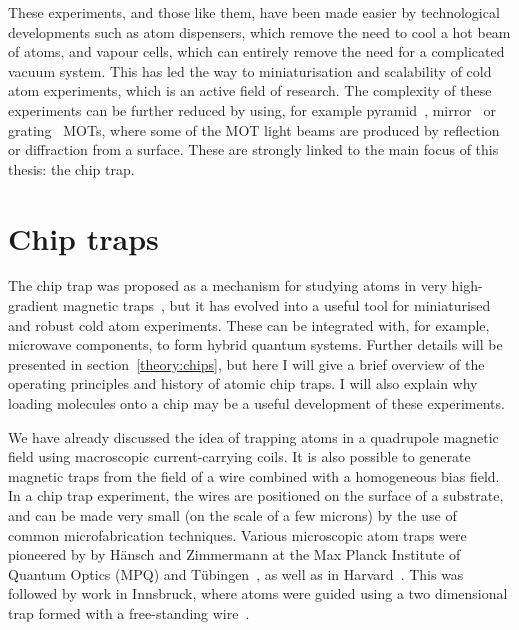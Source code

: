 These experiments, and those like them, have been made easier by technological
developments such as atom dispensers, which remove the need to cool
a hot beam of atoms, and vapour cells, which can entirely remove the
need for a complicated vacuum system. This has led the way to miniaturisation
and scalability of cold atom experiments, which is an active field of research.
The complexity of these experiments can be further reduced by using, for
example pyramid~\cite{Lee:96}, mirror~\cite{Reichel1999, 4797887} or
grating~\cite{Nshii2013} MOTs, where some of the MOT light beams are produced
by reflection or diffraction from a surface. These are strongly linked to the
main focus of this thesis: the chip trap.

\section{Chip traps}

The chip trap was proposed as a mechanism for studying atoms in very
high-gradient magnetic traps~\cite{PhysRevA.52.4004}, but it has evolved into a
useful tool for miniaturised and robust cold atom experiments. These can be
integrated with, for example, microwave components, to form hybrid quantum
systems. Further details will be presented in section~\ref{theory:chips}, but
here I will give a brief overview of the operating principles and history of
atomic chip traps. I will also explain why loading molecules onto a chip may be
a useful development of these experiments.

We have already discussed the idea of trapping atoms in a quadrupole magnetic
field using macroscopic current-carrying coils. It is also possible to generate
magnetic traps from the field of a wire combined with a homogeneous bias field.
In a chip trap experiment, the wires are positioned on the surface of a
substrate, and can be made very small (on the scale of a few microns) by the
use of common microfabrication techniques. Various microscopic atom traps were
pioneered by by H\"ansch and Zimmermann at the Max Planck Institute of Quantum
Optics (MPQ) and T\"ubingen~\cite{PhysRevLett.80.1634, PhysRevLett.81.5310}, as
well as in Harvard~\cite{Drindic1998}. This was followed by work in Innsbruck,
where \Li{} atoms were guided using a two dimensional trap formed with a
free-standing wire~\cite{PhysRevLett.82.2014}. 

